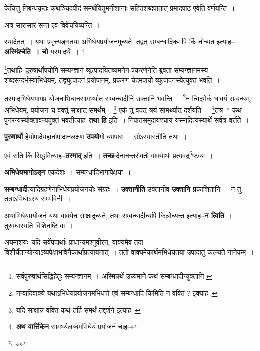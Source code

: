\documentclass[article,12pt,a4paper]{memoir}
\begin{document}
	  \pstart केचित्तु निबन्धकृतः कथञ्चिदपीदं समर्थयितुमनीशानाः सहितशब्दपातात् प्रमादपाठ एवेति वर्णयन्ति ।
	\pend
      

	  \pstart अत्र सारासारं सन्त एव विवेचयिष्यन्ति ।
	\pend
      

	  \pstart स्यादेतत् । यथा प्रवृत्त्यङ्गतया अभिधेयप्रयोजनमुच्यते, तद्वत् सम्बन्धादिकमपि किं नोच्यत इत्याह--\textbf{अस्मिंश्चेति । चो} यस्मादर्थे ।  \leavevmode{} “
	  
	\footnote{सर्वपुरुषार्थसिद्धिहेतुः सम्यग्ज्ञानम् । अस्मिन्नर्थे उच्यमाने कथं सम्बन्धादीन्युक्तानि-\cite{dp-msD-n}}\-तथाहि--पुरुषार्थोपयोगि सम्यग्ज्ञानं व्युत्पादयितव्यमनेन प्रकरणेनेति ब्रुवता सम्यग्ज्ञानमस्य शब्दसन्दर्भस्याभिधेयम्, तद्व्युत्पादनं प्रयोजनम्, प्रकरणं चेदमपायो व्युत्पादनस्येत्युक्तं भवति । 
	  
	तस्मादभिधेयभागप्र योजनाभिधानसामर्थ्थात् सम्बन्धादीनि उक्तानि भवन्ति । \footnote{नन्वादिवाक्ये यथाऽभिधेयप्रयोजनमभिधत्ते एवं सम्बन्धादि किमिति न वक्ति ? इक्याह--\cite{dp-msD-n}}\-न त्विदमेकं धाक्यं सम्बन्धम्, अभिधेयम्, प्रयोजनं च वक्तुं साक्षात् समर्थम् ।\footnote{यदि साक्षान्न वक्ति कथं तर्हि समर्थं तद्दर्शने इत्याह--\cite{dp-msD-n}} एकं तु वदत् त्रयं सामर्थ्यात् दर्शयति । \footnote{\textbf{अथ वार्त्तिकेन} सामर्थ्यलब्धमभिधेयं प्रयोजनं चाह--\cite{dp-msD-n}}\-तत्र--” कथं पुनरन्यस्योक्तावन्यदुक्तं भवतीत्याह--\textbf{तथा हि} इति । निपातसमुदायश्चायं यस्मादित्यस्यार्थे सर्वत्र वर्त्तते ।
	\pend
      

	  \pstart \textbf{पुरुषार्थो} हेयोपादेयहानोपादानलक्षण \textbf{उपयो}गो व्यापारः । सोऽस्यास्तीति तथा ।
	\pend
      

	  \pstart एवं सति किं सिद्धमित्याह--\textbf{तस्माद्} इति । \textbf{तच्छ}ब्देनानन्तरोक्तो वाक्यार्थः प्रत्यवद्र\footnote{म्र}\-ष्टव्यः ।
	\pend
      

	  \pstart \textbf{अभिधेयभागोऽङ्ग} एकदेशः । सम्बन्धादिभागापेक्षया ।
	\pend
      

	  \pstart \textbf{सम्बन्धादी}त्यादिग्रहणेनाभिधेयप्रयोजनयोः संग्रहः । \leavevmode{} \textbf{उक्तानीति} उक्तानीव \textbf{उक्तानि प्र}काशितानि । न तु तत्राऽभिधाऽस्य सम्भविनी ।
	\pend
      

	  \pstart अथाभिधेयप्रयोजनं यथा वाक्येन साक्षादुच्यते, तथा सम्बन्धादीन्यपि किन्नोच्यन्त इत्याह--\textbf{न त्विति} । तुरवधारयति विशिनष्टि वा ।
	\pend
      

	  \pstart अयमाशयः--यदि सर्वेपदार्थाः प्राधान्यमश्नुवीरन्, वाक्यमेव तदा विशीर्येतान्योन्याऽव्यपेक्षाभावेनैकार्थाप्रत्यायनात् । ततो वाक्यमेकार्थमभिधेयतया उपादातुं कल्प्यते नानेकम् ।
	\pend
      
\end{document}
